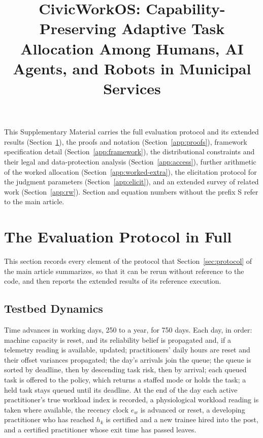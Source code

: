 \documentclass[utf8]{frontiers_suppmat}
\begin{document}
\onecolumn

\title[CivicWorkOS Supplementary]{CivicWorkOS: Capability-Preserving Adaptive Task Allocation Among Humans, AI Agents, and Robots in Municipal Services}

\maketitle

This Supplementary Material carries the full evaluation protocol and its extended results (Section~\ref{app:protocol}), the proofs and notation (Section~\ref{app:proofs}), framework specification detail (Section~\ref{app:framework}), the distributional constraints and their legal and data-protection analysis (Section~\ref{app:access}), further arithmetic of the worked allocation (Section~\ref{app:worked-extra}), the elicitation protocol for the judgment parameters (Section~\ref{app:elicit}), and an extended survey of related work (Section~\ref{app:rw}). Section and equation numbers without the prefix S refer to the main article.

\section{The Evaluation Protocol in Full}
\label{app:protocol}

This section records every element of the protocol that Section~\ref{sec:protocol} of the main article summarizes, so that it can be rerun without reference to the code, and then reports the extended results of its reference execution.

\subsection{Testbed Dynamics}
\label{app:protocol-testbed}

Time advances in working days, 250 to a year, for 750 days. Each day, in order: machine capacity is reset, and its reliability belief is propagated and, if a telemetry reading is available, updated; practitioners' daily hours are reset and their offset variances propagated; the day's arrivals join the queue; the queue is sorted by deadline, then by descending task risk, then by arrival; each queued task is offered to the policy, which returns a staffed mode or holds the task; a held task stays queued until its deadline. At the end of the day each active practitioner's true workload index is recorded, a physiological workload reading is taken where available, the recency clock $e_w$ is advanced or reset, a developing practitioner who has reached $h_k$ is certified and a new trainee hired into the post, and a certified practitioner whose exit time has passed leaves.
\end{document}
